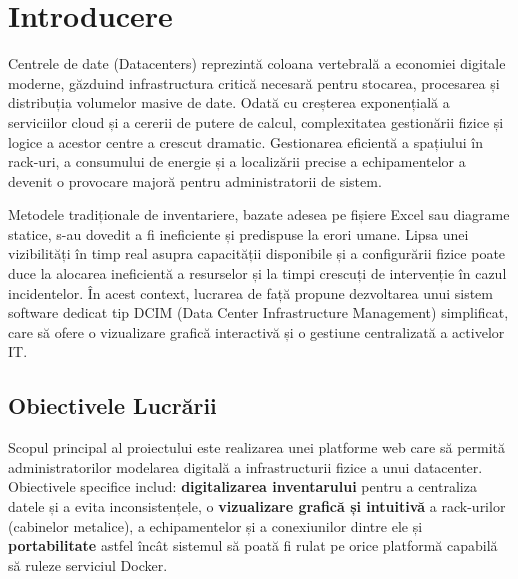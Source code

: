\documentclass[12pt,a4paper]{article}
\begin{document}
\newpage
\tableofcontents



\newpage
\section{Introducere}
\label{sec:introducere}

\hspace{1em} Centrele de date (Datacenters) reprezintă coloana vertebrală a economiei digitale moderne, găzduind infrastructura critică necesară pentru stocarea, procesarea și distribuția volumelor masive de date. Odată cu creșterea exponențială a serviciilor cloud și a cererii de putere de calcul, complexitatea gestionării fizice și logice a acestor centre a crescut dramatic. Gestionarea eficientă a spațiului în rack-uri, a consumului de energie și a localizării precise a echipamentelor a devenit o provocare majoră pentru administratorii de sistem.

Metodele tradiționale de inventariere, bazate adesea pe fișiere Excel sau diagrame statice, s-au dovedit a fi ineficiente și predispuse la erori umane. Lipsa unei vizibilități în timp real asupra capacității disponibile și a configurării fizice poate duce la alocarea ineficientă a resurselor și la timpi crescuți de intervenție în cazul incidentelor. În acest context, lucrarea de față propune dezvoltarea unui sistem software dedicat tip DCIM (Data Center Infrastructure Management) simplificat, care să ofere o vizualizare grafică interactivă și o gestiune centralizată a activelor IT.

\subsection{Obiectivele Lucrării}
\label{subsec:obiective}

\hspace{1em}Scopul principal al proiectului este realizarea unei platforme web care să permită administratorilor modelarea digitală a infrastructurii fizice a unui datacenter. Obiectivele specifice includ: \textbf{digitalizarea inventarului} pentru a centraliza datele și a evita inconsistențele, o \textbf{vizualizare grafică și intuitivă} a rack-urilor (cabinelor metalice), a echipamentelor și a conexiunilor dintre ele și \textbf{portabilitate} astfel încât sistemul să poată fi rulat pe orice platformă capabilă să ruleze serviciul Docker.
\end{document}
